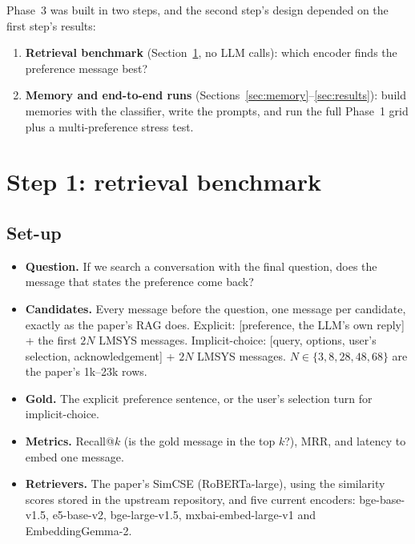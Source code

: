 \documentclass[11pt,a4paper]{article}
\begin{document}
Phase~3 was built in two steps, and the second step's design depended on the first step's results:
\begin{enumerate}
  \item \textbf{Retrieval benchmark} (Section~\ref{sec:retrieval}, no LLM calls): which encoder finds the preference message best?
  \item \textbf{Memory and end-to-end runs} (Sections~\ref{sec:memory}--\ref{sec:results}): build memories with the classifier, write the prompts,
        and run the full Phase~1 grid plus a multi-preference stress test.
\end{enumerate}

\section{Step 1: retrieval benchmark}\label{sec:retrieval}

\subsection{Set-up}
\begin{itemize}
  \item \textbf{Question.} If we search a conversation with the final question, does the message that states the preference come back?
  \item \textbf{Candidates.} Every message before the question, one message per candidate, exactly as the paper's RAG does.
        Explicit: [preference, the LLM's own reply] + the first $2N$ LMSYS messages. Implicit-choice: [query, options, user's selection,
        acknowledgement] + $2N$ LMSYS messages. $N \in \{3, 8, 28, 48, 68\}$ are the paper's 1k--23k rows.
  \item \textbf{Gold.} The explicit preference sentence, or the user's selection turn for implicit-choice.
  \item \textbf{Metrics.} Recall@$k$ (is the gold message in the top $k$?), MRR, and latency to embed one message.
  \item \textbf{Retrievers.} The paper's SimCSE (RoBERTa-large), using the similarity scores stored in the upstream repository, and five current
        encoders: bge-base-v1.5, e5-base-v2, bge-large-v1.5, mxbai-embed-large-v1 and EmbeddingGemma-2.
\end{itemize}
\end{document}
